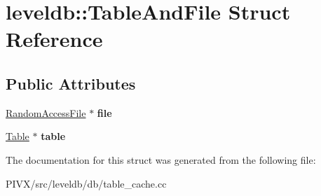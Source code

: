 \hypertarget{structleveldb_1_1_table_and_file}{}\section{leveldb\+:\+:Table\+And\+File Struct Reference}
\label{structleveldb_1_1_table_and_file}
\subsection*{Public Attributes}
\begin{DoxyCompactItemize}
\item 
\mbox{\label{structleveldb_1_1_table_and_file_a7f1f72d4654e4ab49aab750330036edb}} 
\mbox{\hyperlink{classleveldb_1_1_random_access_file}{Random\+Access\+File}} $\ast$ {\bfseries file}
\item 
\mbox{\label{structleveldb_1_1_table_and_file_ab2df8b8a6c028cfcf36885fe76f48c99}} 
\mbox{\hyperlink{classleveldb_1_1_table}{Table}} $\ast$ {\bfseries table}
\end{DoxyCompactItemize}


The documentation for this struct was generated from the following file\+:\begin{DoxyCompactItemize}
\item 
P\+I\+V\+X/src/leveldb/db/table\+\_\+cache.\+cc\end{DoxyCompactItemize}
